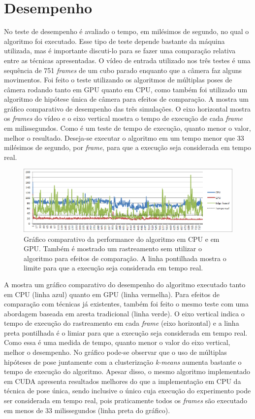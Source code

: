 \section{Desempenho}

No teste de desempenho é avaliado o tempo, em milésimos de segundo, no qual o algoritmo foi executado. Esse tipo de teste depende bastante da máquina utilizada, mas é importante discuti-lo para se fazer uma comparação relativa entre as técnicas apresentadas. O vídeo de entrada utilizado nos três testes é uma sequência de 751 \emph{frames} de um cubo parado enquanto que a câmera faz alguns movimentos. Foi feito o teste utilizando os algoritmos de múltiplas poses de câmera rodando tanto em GPU quanto em CPU, como também foi utilizado um algoritmo de hipótese única de câmera para efeitos de comparação. A  mostra um gráfico comparativo de desempenho das três simulações. O eixo horizontal mostra os \emph{frames} do vídeo e o eixo vertical mostra o tempo de execução de cada \emph{frame} em milissegundos. Como é um teste de tempo de execução, quanto menor o valor, melhor o resultado. Deseja-se executar o algoritmo em um tempo menor que 33 milésimos de segundo, por \emph{frame}, para que a execução seja considerada em tempo real.

\begin{figure}[!ht]
\centering\includegraphics[width=\textwidth]{monografia/performance}
\caption{Gráfico comparativo da performance do algoritmo em CPU e em GPU. Também é mostrado um rastreamento sem utilizar o algoritmo para efeitos de comparação. A linha pontilhada mostra o limite para que a execução seja considerada em tempo real.}
\label{performance}
\end{figure}

A  mostra um gráfico comparativo do desempenho do algoritmo executado tanto em CPU (linha azul) quanto em GPU (linha vermelha). Para efeitos de comparação com técnicas já existentes, também foi feito o mesmo teste com uma abordagem baseada em aresta tradicional (linha verde). O eixo vertical indica o tempo de execução do rastreamento em cada \emph{frame} (eixo horizontal) e a linha preta pontilhada é o limiar para que a execução seja considerada em tempo real. Como essa é uma medida de tempo, quanto menor o valor do eixo vertical, melhor o desempenho. No gráfico pode-se observar que o uso de múltiplas hipóteses de pose juntamente com a clusterização \emph{k-means} aumenta bastante o tempo de execução do algoritmo. Apesar disso, o mesmo algoritmo implementado em CUDA apresenta resultados melhores do que a implementação em CPU da técnica de pose única, sendo inclusive o único cuja execução do experimento pode ser considerada em tempo real, pois praticamente todos os \emph{frames} são executado em menos de 33 milissegundos (linha preta do gráfico).
